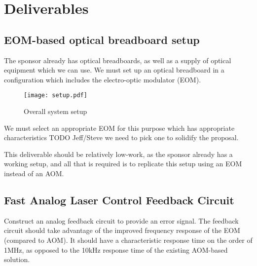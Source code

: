 \newpage
\section{Deliverables}

\subsection{EOM-based optical breadboard setup}

The sponsor already has optical breadboards, as well as a supply of optical equipment which we can use.  We must set up an optical breadboard in a configuration which includes the electro-optic modulator (EOM).

\begin{figure}
  \centering
  \label{setup}
  \texttt{[image: setup.pdf]}
  \caption{Overall system setup}
\end{figure}

We must select an appropriate EOM for this purpose which has appropriate characteristics TODO Jeff/Steve we need to pick one to solidify the proposal.

This deliverable should be relatively low-work, as the sponsor already has a working setup, and all that is required is to replicate this setup using an EOM instead of an AOM.

\subsection{Fast Analog Laser Control Feedback Circuit}

Construct an analog feedback circuit to provide an error signal.  The feedback circuit should take advantage of the improved frequency response of the EOM (compared to AOM).  It should have a characteristic response time on the order of 1MHz, as opposed to the 10kHz response time of the existing AOM-based solution.

